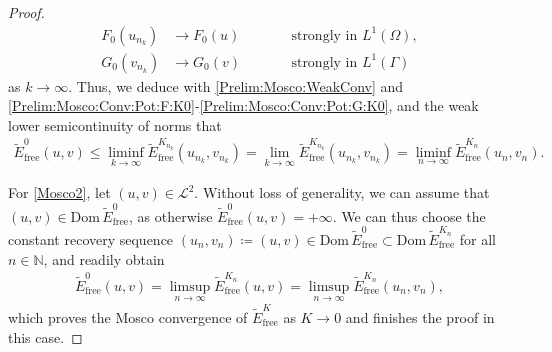 \documentclass[11pt,reqno]{amsart}
\theoremstyle{remark}
\numberwithin{equation}{section}
\newcommand{\N}{\mathbb N}
\newcommand{\Ga}{\Gamma}
\newcommand{\free}{\mathrm{free}}
\begin{document}
\begin{proof}
    \begin{subequations}
        \begin{alignat}{2}
            F_0(u_{n_k})&\rightarrow F_0(u) &&\qquad\text{strongly in~}L^1(\Omega), \label{Prelim:Mosco:Conv:Pot:F:K0}\\
            G_0(v_{n_k})&\rightarrow G_0(v) &&\qquad\text{strongly in~}L^1(\Ga)\label{Prelim:Mosco:Conv:Pot:G:K0}
        \end{alignat}
    \end{subequations}
    as $k\rightarrow\infty$. Thus, we deduce with \eqref{Prelim:Mosco:WeakConv} and \eqref{Prelim:Mosco:Conv:Pot:F:K0}-\eqref{Prelim:Mosco:Conv:Pot:G:K0}, and the weak lower semicontinuity of norms that
    \begin{align*}
        \widetilde E_\free^0(u,v) \leq \liminf_{k\rightarrow\infty} \widetilde E_\free^{K_{n_k}}(u_{n_k},v_{n_k}) = \lim_{k\rightarrow\infty} \widetilde E_\free^{K_{n_k}}(u_{n_k},v_{n_k}) = \liminf_{n\rightarrow\infty} \widetilde E_\free^{K_n}(u_n,v_n).
    \end{align*}
    
    For \ref{Mosco2}, let $(u,v)\in\mathcal{L}^2$. Without loss of generality, we can assume that $(u,v)\in\mathrm{Dom}\,\widetilde E_\free^0$, as otherwise $\widetilde E_\free^0(u,v) = +\infty$. We can thus choose the constant recovery sequence $(u_n,v_n)\coloneqq (u,v)\in \mathrm{Dom}\,\widetilde E_\free^0\subset \mathrm{Dom}\,\widetilde E_\free^{K_n}$ for all $n\in\N$, and readily obtain
    \begin{align*}
        \widetilde E_\free^0(u,v) = \limsup_{n\rightarrow\infty} \widetilde E_\free^{K_n}(u,v) = \limsup_{n\rightarrow\infty} \widetilde E_\free^{K_n}(u_n,v_n),
    \end{align*}
    which proves the Mosco convergence of $\widetilde E_\free^K$ as $K\rightarrow 0$ and finishes the proof in this case.


\end{proof}
\end{document}
